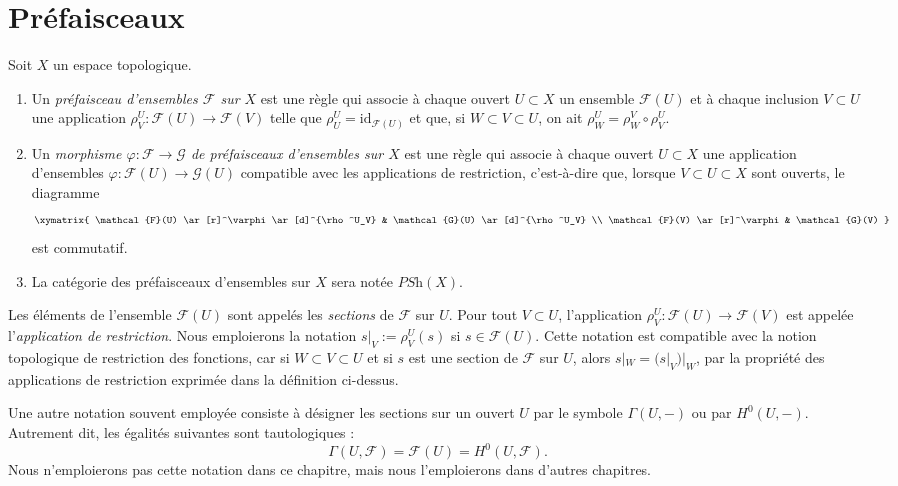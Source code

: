 \section{Préfaisceaux}
\label{section-presheaves}


\begin{definition}
\label{definition-presheaf}
Soit $X$ un espace topologique.
\begin{enumerate}
\item Un {\it préfaisceau d'ensembles $\mathcal{F}$ sur $X$} est une règle qui
associe à chaque ouvert $U \subset X$ un ensemble $\mathcal{F}(U)$ et
à chaque inclusion $V \subset U$ une application
$\rho^U_V : \mathcal{F}(U) \to \mathcal{F}(V)$ telle que
$\rho^U_U = \text{id}_{\mathcal{F}(U)}$ et que,
si $W \subset V \subset U$, on ait
$\rho^U_W = \rho^V_W \circ \rho ^U_V$.
\item Un {\it morphisme $\varphi : \mathcal{F} \to \mathcal{G}$
de préfaisceaux d'ensembles sur $X$} est une règle qui associe à chaque
ouvert $U \subset X$ une application d'ensembles $\varphi : \mathcal{F}(U)
\to \mathcal{G}(U)$ compatible avec les applications de restriction,
c'est-à-dire que, lorsque $V \subset U \subset X$ sont ouverts, le
diagramme
$$
\xymatrix{
\mathcal{F}(U) \ar[r]^\varphi \ar[d]^{\rho^U_V} &
\mathcal{G}(U) \ar[d]^{\rho^U_V} \\
\mathcal{F}(V) \ar[r]^\varphi & \mathcal{G}(V)
}
$$
est commutatif.
\item La catégorie des préfaisceaux d'ensembles sur $X$ sera notée
$\textit{PSh}(X)$.
\end{enumerate}
\end{definition}

\noindent
Les éléments de l'ensemble $\mathcal{F}(U)$ sont appelés
les {\it sections} de $\mathcal{F}$ sur $U$.
Pour tout $V \subset U$, l'application
$\rho^U_V : \mathcal{F}(U) \to \mathcal{F}(V)$
est appelée l'{\it application de restriction}. Nous emploierons la
notation $s|_V := \rho^U_V(s)$ si $s\in \mathcal{F}(U)$.
Cette notation est compatible avec la notion topologique de restriction
des fonctions, car si $W \subset V \subset U$
et si $s$ est une section de $\mathcal{F}$ sur $U$, alors
$s|_W = (s|_V)|_W$, par la propriété des applications de restriction
exprimée dans la définition ci-dessus.

\medskip\noindent
Une autre notation souvent employée consiste à désigner les sections
sur un ouvert $U$ par le symbole $\Gamma(U, -)$ ou par
$H^0(U, -)$. Autrement dit, les égalités suivantes
sont tautologiques :
$$
\Gamma(U, \mathcal{F}) = \mathcal{F}(U) = H^0(U, \mathcal{F}).
$$
Nous n'emploierons pas cette notation dans ce chapitre, mais nous
l'emploierons dans d'autres chapitres.


